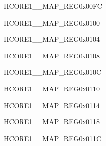 \begin{register}{H}{CORE1\_\_MAP\_REG}{0x00FC}\label{regdesc:CORE1AXIPDMAINCH1INTMAPREG}
\end{register}\vspace{-3em}


\begin{register}{H}{CORE1\_\_MAP\_REG}{0x0100}\label{regdesc:CORE1AXIPDMAINCH2INTMAPREG}
\end{register}\vspace{-3em}


\begin{register}{H}{CORE1\_\_MAP\_REG}{0x0104}\label{regdesc:CORE1AXIPDMAOUTCH0INTMAPREG}
\end{register}\vspace{-3em}


\begin{register}{H}{CORE1\_\_MAP\_REG}{0x0108}\label{regdesc:CORE1AXIPDMAOUTCH1INTMAPREG}
\end{register}\vspace{-3em}


\begin{register}{H}{CORE1\_\_MAP\_REG}{0x010C}\label{regdesc:CORE1AXIPDMAOUTCH2INTMAPREG}
\end{register}\vspace{-3em}


\begin{register}{H}{CORE1\_\_MAP\_REG}{0x0110}\label{regdesc:CORE1RSAINTMAPREG}
\end{register}\vspace{-3em}


\begin{register}{H}{CORE1\_\_MAP\_REG}{0x0114}\label{regdesc:CORE1AESINTMAPREG}
\end{register}\vspace{-3em}


\begin{register}{H}{CORE1\_\_MAP\_REG}{0x0118}\label{regdesc:CORE1SHAINTMAPREG}
\end{register}\vspace{-3em}


\begin{register}{H}{CORE1\_\_MAP\_REG}{0x011C}\label{regdesc:CORE1ECCINTMAPREG}
\end{register}\vspace{-3em}


